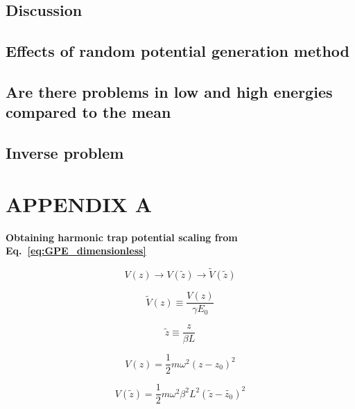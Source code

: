\documentclass[a4paper,times,hidelinks,12pt]{article}
\begin{document}
\subsection{Discussion}
\subsection{Effects of random potential generation method}
\subsection{Are there problems in low and high energies compared to the mean}
\subsection{Inverse problem}


\clearpage

\clearpage




\appendix
\section{APPENDIX A}
\label{ap:scale}

\textbf{Obtaining harmonic trap potential scaling from Eq.~\eqref{eq:GPE_dimensionless}}

\begin{equation}
\label{eq:GPESCALE_harmonic_potential_transform}
    V(z) \rightarrow V(\widetilde{z}) \rightarrow \widetilde{V}(\widetilde{z})
\end{equation}

\begin{equation}
\label{eq:GPESCALE_dimensionless_harmonic_potential}
    \widetilde{V}(z) \equiv \frac{V(z)}{\gamma E_0}
\end{equation}

\begin{equation}
\label{eq:GPESCALE_dimensionless_length}
    \widetilde{z} \equiv \frac{z}{\beta L} 
\end{equation}

\begin{equation}
\label{eq:GPESCALE_harmonic_potential}
    V(z) = \frac{1}{2}m\omega^2 (z-z_0)^2
\end{equation}

\begin{equation}
\label{eq:GPESCALE_harmonic_length_transform}
    V(\widetilde{z}) = \frac{1}{2}m\omega^2 \beta^2 L^2 (\widetilde{z}-\widetilde{z_0})^2
\end{equation}
\end{document}
